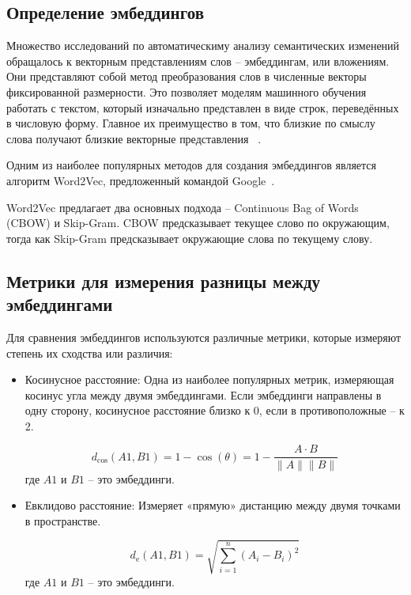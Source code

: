 \documentclass[LI,VKR]{HSEUniversity}
\begin{document}
\subsection{Определение эмбеддингов}

Множество исследований по автоматическиму анализу семантических изменений обращалось
к векторным представлениям слов – эмбеддингам, или вложениям.
Они представляют собой метод преобразования
слов в численные векторы фиксированной размерности.
Это позволяет моделям машинного обучения работать с текстом,
который изначально представлен в виде строк, переведённых в числовую форму.
Главное их преимущество в том, что близкие по смыслу слова получают близкие векторные представления
~\cite{Word2VecModelAnalysis}.

Одним из наиболее популярных методов для создания эмбеддингов является алгоритм Word2Vec,
предложенный командой Google~\cite{Word2VecOriginal}.

Word2Vec предлагает два основных подхода – Continuous Bag of Words (CBOW) и Skip-Gram.
CBOW предсказывает текущее слово по окружающим,
тогда как Skip-Gram предсказывает окружающие слова по текущему слову.

\subsection{Метрики для измерения разницы между эмбеддингами}

Для сравнения эмбеддингов используются различные метрики, которые измеряют степень их сходства или различия:
\begin{itemize}
    \item Косинусное расстояние: Одна из наиболее популярных метрик, измеряющая косинус угла между двумя эмбеддингами.
    Если эмбеддинги направлены в одну сторону, косинусное расстояние близко к 0, если в противоположные – к 2.

    \begin{equation}
    d_{\text{cos}}(A1, B1) = 1 - \cos(\theta) = 1 - \frac{A \cdot B}{\|A\| \|B\|}
    \end{equation}
    где $A1$ и $B1$ – это эмбеддинги.

    \item Евклидово расстояние: Измеряет «прямую» дистанцию между двумя точками в пространстве.

    \begin{equation}
    d_{\text{e}}(A1, B1) = \sqrt{\sum_{i=1}^{n} (A_i - B_i)^2}
    \end{equation}
    где $A1$ и $B1$ – это эмбеддинги.
\end{itemize}
\end{document}
